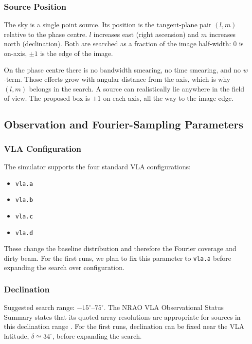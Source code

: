 \documentclass[11pt]{article}
\begin{document}
\subsubsection{Source Position}
\label{sec:param-source-position}

The sky is a single point source. Its position is the tangent-plane pair $(l,m)$ relative to the phase centre.
$l$ increases east (right ascension) and $m$ increases north (declination).
Both are searched as a fraction of the image half-width: $0$ is on-axis, $\pm 1$ is the edge of the image.

On the phase centre there is no bandwidth smearing, no time smearing, and no $w$-term.
Those effects grow with angular distance from the axis, which is why $(l,m)$ belongs in the search.
A source can realistically lie anywhere in the field of view.
The proposed box is $\pm 1$ on each axis, all the way to the image edge.

\subsection{Observation and Fourier-Sampling Parameters}

\subsubsection{VLA Configuration}
\label{sec:param-vla-configuration}

The simulator supports the four standard VLA configurations:
\begin{itemize}
    \item \texttt{vla.a}
    \item \texttt{vla.b}
    \item \texttt{vla.c}
    \item \texttt{vla.d}
\end{itemize}
These change the baseline distribution and therefore the Fourier coverage and dirty beam.
For the first runs, we plan to fix this parameter to \texttt{vla.a} before expanding the search over configuration.

\subsubsection{Declination}
\label{sec:param-declination}

Suggested search range: $-15^\circ$--$75^\circ$.
The NRAO VLA Observational Status Summary states that its quoted array resolutions are appropriate for sources in this declination range \cite{nrao-vla-resolution}.
For the first runs, declination can be fixed near the VLA latitude, $\delta \simeq 34^\circ$, before expanding the search.
\end{document}
